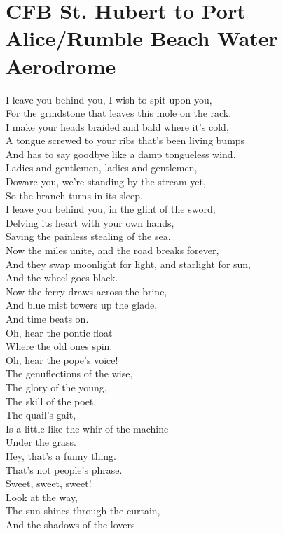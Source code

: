 \documentclass[smalldemyvopaper,11pt,twoside,onecolumn,openright,extrafontsizes]{memoir}
\begin{document}
\chapter{CFB St. Hubert to Port Alice/Rumble Beach Water Aerodrome}
I leave you behind you, I wish to spit upon you,
\\For the grindstone that leaves this mole on the rack.
\\I make your heads braided and bald where it's cold,
\\A tongue screwed to your ribs that's been living bumps
\\And has to say goodbye like a damp tongueless wind.
\\Ladies and gentlemen, ladies and gentlemen,
\\Doware you, we're standing by the stream yet,
\\So the branch turns in its sleep.
\\I leave you behind you, in the glint of the sword,
\\Delving its heart with your own hands,
\\Saving the painless stealing of the sea.
\\Now the miles unite, and the road breaks forever,
\\And they swap moonlight for light, and starlight for sun,
\\And the wheel goes black.
\\Now the ferry draws across the brine,
\\And blue mist towers up the glade,
\\And time beats on.
\\Oh, hear the pontic float
\\Where the old ones spin.
\\Oh, hear the pope's voice!
\\The genuflections of the wise,
\\The glory of the young,
\\The skill of the poet,
\\The quail's gait,
\\Is a little like the whir of the machine
\\Under the grass.
\\Hey, that's a funny thing.
\\That's not people's phrase.
\\Sweet, sweet, sweet!
\\Look at the way,
\\The sun shines through the curtain,
\\And the shadows of the lovers
\end{document}
